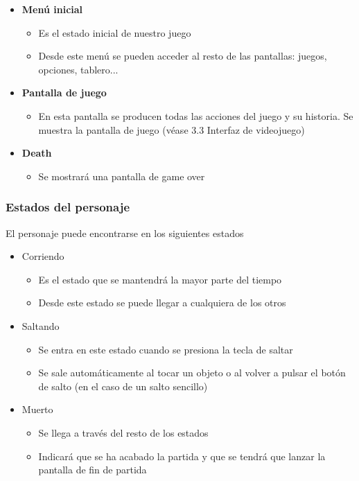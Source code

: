 \documentclass[palatino]{apuntes}
\begin{document}
\begin{itemize}
    \item \textbf{Menú inicial}
        \begin{itemize}
            \item Es el estado inicial de nuestro juego
            \item Desde este menú se pueden acceder al resto de las pantallas: juegos, opciones, tablero...
        \end{itemize}
    \item \textbf{Pantalla de juego}
        \begin{itemize}
            \item En esta pantalla se producen todas las acciones del juego y su historia. Se muestra la pantalla de juego (véase 3.3 Interfaz de videojuego)
        \end{itemize}
    
    \item \textbf{Death}
        \begin{itemize}
            \item Se mostrará una pantalla de game over
        \end{itemize}
            
\end{itemize}


\subsubsection{Estados del personaje}
El personaje puede encontrarse en los siguientes estados

\begin{itemize}
    \item Corriendo
    \begin{itemize}
        \item Es el estado que se mantendrá la mayor parte del tiempo
        \item Desde este estado se puede llegar a cualquiera de los otros
    \end{itemize}
    \item Saltando
    \begin{itemize}
        \item Se entra en este estado cuando se presiona la tecla de saltar
        \item Se sale automáticamente al tocar un objeto o al volver a pulsar el botón de salto (en el caso de un salto sencillo)
    \end{itemize}
    \item Muerto
    \begin{itemize}
        \item Se llega a través del resto de los estados
        \item Indicará que se ha acabado la partida y que se tendrá que lanzar la pantalla de fin de partida
    \end{itemize}
\end{itemize}
\end{document}
